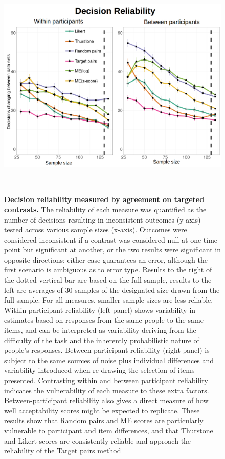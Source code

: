 \documentclass[doc]{apa6}
\newcommand{\targchoice}{{\sc Target pairs}}
\newcommand{\rndchoice}{{\sc Random pairs}}
\newcommand{\ME}{{\sc ME}}%
\newcommand{\thurstone}{{\sc Thurstone}}
\newcommand{\likert}{{\sc Likert}}
\begin{document}
\begin{figure}[ht!]
\centering
\includegraphics[height=11cm,keepaspectratio]
{figures/reliability_decisions.png}
\caption{{\small {\bf Decision reliability measured by agreement on targeted contrasts.} The reliability of each measure was quantified as the number of decisions resulting in inconsistent outcomes (y-axis) tested across various sample sizes (x-axis). Outcomes were considered inconsistent if a contrast was considered null at one time point but significant at another, or the two results were significant in opposite directions: either case guarantees an error, although the first scenario is ambiguous as to error type.
Results to the right of the dotted vertical bar are based on the full sample, results to the left are averages of 30 samples of the designated size drawn from the full sample. For all measures, smaller sample sizes are less reliable.
Within-participant reliability (left panel) shows variability in estimates based on responses from the same people to the same items, and can be interpreted as variability deriving from the difficulty of the task and the inherently probabilistic nature of people's responses.
Between-participant reliability (right panel) is subject to the same sources of noise plus individual differences and variability introduced when re-drawing the selection of items presented. Contrasting within and between participant reliability indicates the vulnerability of each measure to these extra factors. Between-participant reliability also gives a direct measure of how well acceptability scores might be expected to replicate.
These results show that \rndchoice{} and \ME{} scores are particularly vulnerable to participant and item differences, and that \thurstone{} and \likert{} scores are consistently reliable and approach the reliability of the \targchoice{} method
}}
\label{reliability_decision}
\end{figure}
\end{document}
